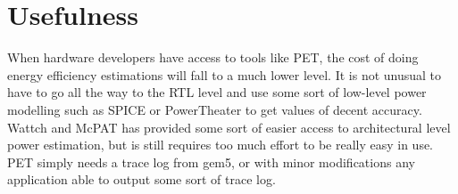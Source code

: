 \section{Usefulness}
When hardware developers have access to tools like PET, the cost of doing energy efficiency estimations will fall
to a much lower level. It is not unusual to have to go all the way to the RTL level and use some sort of
low-level power modelling such as SPICE\cite{ponomarev2002accupower} or PowerTheater\cite{bruno2005rtl} to
get values of decent accuracy. Wattch and McPAT has provided some sort of easier access to architectural level
power estimation, but is still requires too much effort to be really easy in use. PET simply needs a trace log
from gem5, or with minor modifications any application able to output some sort of trace log.

